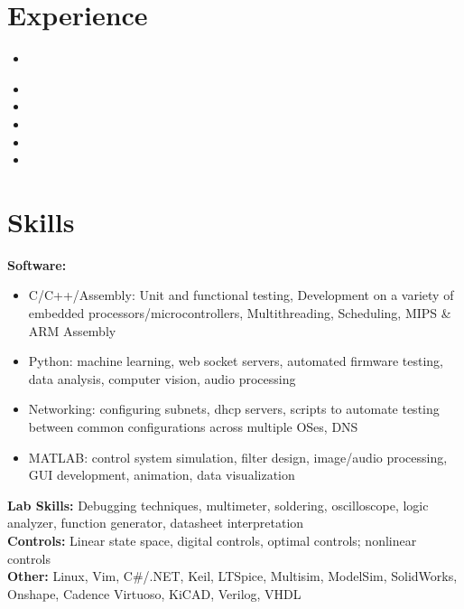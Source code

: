 \documentclass[11pt, a4paper]{article}
\begin{document}
\headerSimple

\section*{Experience}
{\scriptsize

  \workplaceBeam
  \begin{itemize}
    \item \experienceBeamMedium
  \end{itemize}

  \workplaceGTRI
  \begin{itemize}
    \item \experienceGTRIEdgeMLLong
    \item \experienceGTRIFPGA
    \item \experienceGTRIGimbal
    \item \experienceGTRIEmbedded
    \item \experienceGTRIManagement
  \end{itemize}

  \workplaceClappingDetector

  \workplaceEmotionSpeech
  \experienceItemsEmotionSpeechLong

  \workplaceSeniorDesign
  
  \workplaceDDL

  \workplaceMLforT
  
  \workplaceConvexMind

}

\section*{Skills}
{\scriptsize
  \textbf{Software:}
  \begin{itemize}[noitemsep] %
    \item C/C++/Assembly: Unit and functional testing, Development on a variety of embedded processors/microcontrollers, Multithreading, Scheduling, MIPS \& ARM Assembly
    \item Python: machine learning, web socket servers, automated firmware testing, data analysis, computer vision, audio processing
    \item Networking: configuring subnets, dhcp servers, scripts to automate testing between common configurations across multiple OSes, DNS
    \item MATLAB: control system simulation, filter design, image/audio processing, GUI development, animation, data visualization
  \end{itemize}
  \textbf{Lab Skills:} Debugging techniques, multimeter, soldering, oscilloscope, logic analyzer, function generator, datasheet interpretation\\
  \textbf{Controls:} Linear state space, digital controls, optimal controls; nonlinear controls\\
  \textbf{Other:} Linux, Vim, C\#/.NET, Keil, LTSpice, Multisim, ModelSim, SolidWorks, Onshape, Cadence Virtuoso, KiCAD, Verilog, VHDL\par\noindent
}
\end{document}
